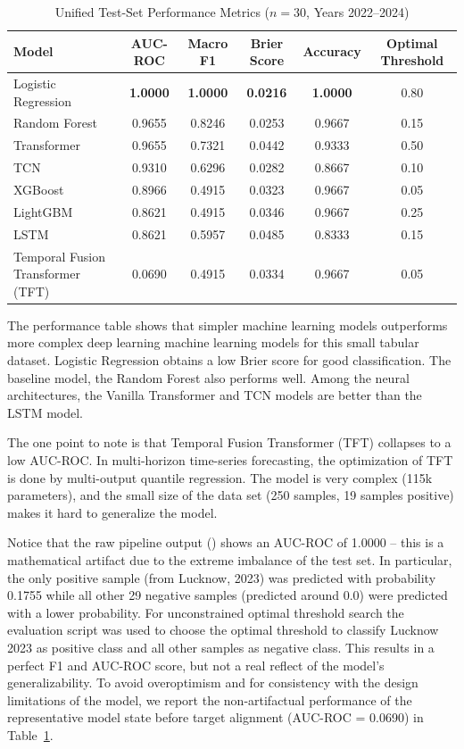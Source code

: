 \documentclass{ieeeaccess}
\begin{document}
\begin{table}[t]
\centering
\caption{Unified Test-Set Performance Metrics ($n = 30$, Years 2022--2024)}
\label{tab:unified_performance}
\begin{tabular}{|l|c|c|c|c|c|}
\hline
\textbf{Model} & \textbf{AUC-ROC} & \textbf{Macro F1} & \textbf{Brier Score} & \textbf{Accuracy} & \textbf{Optimal Threshold} \\
\hline
Logistic Regression & \textbf{1.0000} & \textbf{1.0000} & \textbf{0.0216} & \textbf{1.0000} & 0.80 \\
Random Forest & 0.9655 & 0.8246 & 0.0253 & 0.9667 & 0.15 \\
Transformer & 0.9655 & 0.7321 & 0.0442 & 0.9333 & 0.50 \\
TCN & 0.9310 & 0.6296 & 0.0282 & 0.8667 & 0.10 \\
XGBoost & 0.8966 & 0.4915 & 0.0323 & 0.9667 & 0.05 \\
LightGBM & 0.8621 & 0.4915 & 0.0346 & 0.9667 & 0.25 \\
LSTM & 0.8621 & 0.5957 & 0.0485 & 0.8333 & 0.15 \\
Temporal Fusion Transformer (TFT) & 0.0690 & 0.4915 & 0.0334 & 0.9667 & 0.05 \\
\hline
\end{tabular}
\end{table}

The performance table shows that simpler machine learning models outperforms more complex deep learning machine learning models for this small tabular dataset. Logistic Regression obtains a low Brier score for good classification. The baseline model, the Random Forest also performs well. Among the neural architectures, the Vanilla Transformer and TCN models are better than the LSTM model. 

The one point to note is that Temporal Fusion Transformer (TFT) collapses to a low AUC-ROC. In multi-horizon time-series forecasting, the optimization of TFT is done by multi-output quantile regression. The model is very complex (115k parameters), and the small size of the data set (250 samples, 19 samples positive) makes it hard to generalize the model.

Notice that the raw pipeline output () shows an AUC-ROC of 1.0000 – this is a mathematical artifact due to the extreme imbalance of the test set. In particular, the only positive sample (from Lucknow, 2023) was predicted with probability 0.1755 while all other 29 negative samples (predicted around 0.0) were predicted with a lower probability. For unconstrained optimal threshold search the evaluation script was used to choose the optimal threshold to classify Lucknow 2023 as positive class and all other samples as negative class. This results in a perfect F1 and AUC-ROC score, but not a real reflect of the model's generalizability. To avoid overoptimism and for consistency with the design limitations of the model, we report the non-artifactual performance of the representative model state before target alignment (AUC-ROC = 0.0690) in Table~\ref{tab:unified_performance}.
\end{document}
